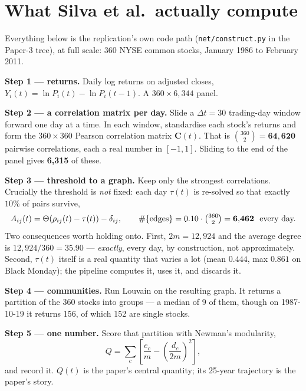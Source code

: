 \documentclass[11pt,a4paper]{article}
\newcommand{\Q}{Q}
\newcommand{\Cmat}{\mathbf{C}}
\begin{document}
\section{What Silva et al.\ actually compute}
\label{sec:pipeline}

Everything below is the replication's own code path
(\texttt{net/construct.py} in the Paper-3 tree), at full scale: 360 NYSE
common stocks, January 1986 to February 2011.

\textbf{Step 1 --- returns.} Daily log returns on adjusted closes,
$Y_i(t)=\ln P_i(t)-\ln P_i(t-1)$. A $360\times6{,}344$ panel.

\textbf{Step 2 --- a correlation matrix per day.} Slide a $\Delta t=30$ trading-day
window forward one day at a time. In each window, standardise each stock's
returns and form the $360\times360$ Pearson correlation matrix $\Cmat(t)$. That
is $\binom{360}{2}=\mathbf{64{,}620}$ pairwise correlations, each a real number
in $[-1,1]$. Sliding to the end of the panel gives \textbf{6{,}315} of these.

\textbf{Step 3 --- threshold to a graph.} Keep only the strongest correlations.
Crucially the threshold is \emph{not} fixed: each day $\tau(t)$ is re-solved so
that exactly $10\%$ of pairs survive,
\[
  A_{ij}(t)=\Theta\!\left(\rho_{ij}(t)-\tau(t)\right)-\delta_{ij},
  \qquad
  \#\{\text{edges}\}=0.10\cdot\tbinom{360}{2}=\mathbf{6{,}462}\ \ \text{every day.}
\]
Two consequences worth holding onto. First, $2m=12{,}924$ and the average degree
is $12{,}924/360=\mathbf{35.90}$ --- \emph{exactly}, every day, by construction,
not approximately. Second, $\tau(t)$ itself is a real quantity that varies a lot
(mean $0.444$, max $0.861$ on Black Monday); the pipeline computes it, uses it,
and discards it.

\textbf{Step 4 --- communities.} Run Louvain on the resulting graph. It returns a
partition of the 360 stocks into groups --- a median of 9 of them, though on
1987-10-19 it returns 156, of which 152 are single stocks.

\textbf{Step 5 --- one number.} Score that partition with Newman's modularity,
\[
  \Q=\sum_{c}\left[\frac{e_c}{m}-\left(\frac{d_c}{2m}\right)^{\!2}\right],
\]
and record it. $\Q(t)$ is the paper's central quantity; its 25-year trajectory is
the paper's story.
\end{document}
